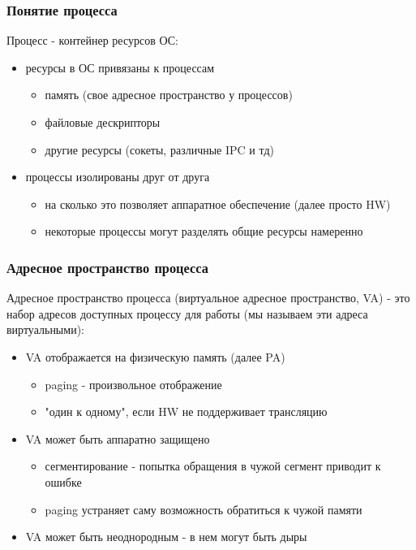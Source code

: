 \begin{frame}
\frametitle{Понятие процесса}

Процесс - контейнер ресурсов ОС:
\begin{itemize}
  \item<2-> ресурсы в ОС привязаны к процессам
    \begin{itemize}
      \item память (свое адресное пространство у процессов)
      \item файловые дескрипторы
      \item другие ресурсы (сокеты, различные IPC и тд)
    \end{itemize}
  \item<3-> процессы изолированы друг от друга
    \begin{itemize}
      \item на сколько это позволяет аппаратное обеспечение (далее просто HW)
      \item некоторые процессы могут разделять общие ресурсы намеренно
    \end{itemize}
\end{itemize}

\end{frame}

\begin{frame}
\frametitle{Адресное пространство процесса}

Адресное пространство процесса (виртуальное адресное пространство, VA) - это набор адресов доступных процессу для работы (мы называем эти адреса виртуальными):

\begin{itemize}
  \item<2-> VA отображается на физическую память (далее PA)
    \begin{itemize}
      \item paging - произвольное отображение
      \item "один к одному", если HW не поддерживает трансляцию
    \end{itemize}
  \item<3-> VA может быть аппаратно защищено
    \begin{itemize}
      \item сегментирование - попытка обращения в чужой сегмент приводит к ошибке
      \item paging устраняет саму возможность обратиться к чужой памяти
    \end{itemize}
  \item<4-> VA может быть неоднородным - в нем могут быть дыры
\end{itemize}
\end{frame}

